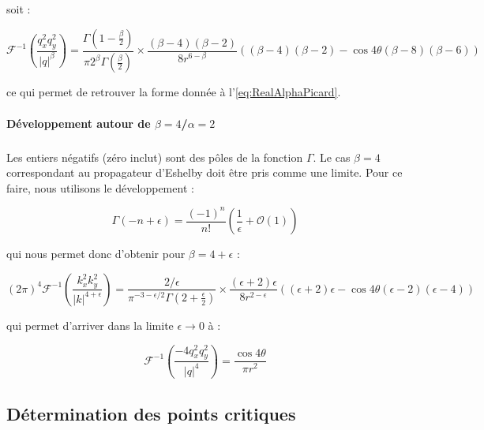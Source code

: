 \noindent soit :

\begin{equation}
    \mathcal{F}^{-1}\left( \frac{q_x^2q_y^2}{\lvert q \rvert^\beta} \right) = \frac{\Gamma\left( 1-\frac{\beta}{2} \right)}{\pi 2^\beta\Gamma\left( \frac{\beta}{2} \right)}\times\frac{(\beta-4)(\beta-2)}{8r^{6-\beta}}\left( (\beta-4)(\beta-2)-\cos4\theta(\beta-8)(\beta-6) \right)
\end{equation}

\noindent ce qui permet de retrouver la forme donnée à l'\autoref{eq:RealAlphaPicard}.


\paragraph{Développement autour de $\beta = 4$/$\alpha=2$}

\subparagraph{}Les entiers négatifs (zéro inclut) sont des pôles de la fonction $\Gamma$. Le cas $\beta = 4$ correspondant au propagateur d'Eshelby doit être pris comme une limite. Pour ce faire, nous utilisons le développement :

\begin{equation}
    \Gamma(-n+\epsilon) = \frac{(-1)^n}{n!}\left( \frac{1}{\epsilon}+\mathcal{O}(1) \right)
\end{equation}

\noindent qui nous permet donc d'obtenir pour $\beta=4+\epsilon$ :

\begin{equation}
    (2\pi)^4\mathcal{F}^{-1}\left( \frac{k_x^2k_y^2}{\lvert k \rvert^{4+\epsilon}} \right)=\frac{2/\epsilon}{\pi^{-3-\epsilon/2}\Gamma\left( 2+\frac{\epsilon}{2} \right)}\times\frac{(\epsilon+2)\epsilon}{8r^{2-\epsilon}}((\epsilon+2)\epsilon-\cos4\theta(\epsilon-2)(\epsilon-4))
\end{equation}

\noindent qui permet d'arriver dans la limite $\epsilon \rightarrow 0$ à :

\begin{equation}
    \mathcal{F}^{-1}\left( \frac{-4q_x^2q_y^2}{\lvert q \rvert^{4}} \right)=\frac{\cos4\theta}{\pi r^2}
\end{equation}

\subsection{Détermination des points critiques}

\label{sec:CP_aPicard}

